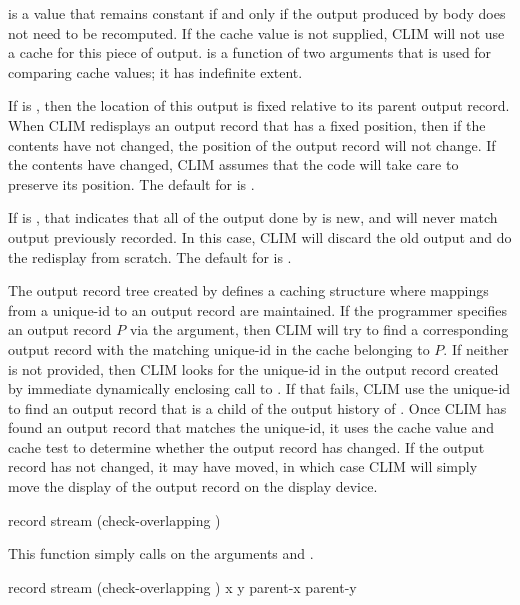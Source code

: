  is a value that remains constant if and only if the output
produced by body does not need to be recomputed.  If the cache value is not
supplied, CLIM will not use a cache for this piece of output.  
is a function of two arguments that is used for comparing cache values; it has
indefinite extent.

If  is , then the location of this output is
fixed relative to its parent output record.  When CLIM redisplays an output
record that has a fixed position, then if the contents have not changed, the
position of the output record will not change.  If the contents have changed,
CLIM assumes that the code will take care to preserve its position.  The default
for  is .

If  is , that indicates that all of the output done by
 is new, and will never match output previously recorded.  In this
case, CLIM will discard the old output and do the redisplay from scratch.  The
default for  is .

The output record tree created by  defines a caching
structure where mappings from a unique-id to an output record are maintained.
If the programmer specifies an output record $P$ via the
 argument, then CLIM will try to find a corresponding output
record with the matching unique-id in the cache belonging to $P$.  If neither
 is not provided, then CLIM looks for the unique-id in the
output record created by immediate dynamically enclosing call to
.  If that fails, CLIM use the unique-id to find an output
record that is a child of the output history of .  Once CLIM has
found an output record that matches the unique-id, it uses the cache value and
cache test to determine whether the output record has changed.  If the output
record has not changed, it may have moved, in which case CLIM will simply move
the display of the output record on the display device.


 {record stream \key (check-overlapping )}

This function simply calls  on the arguments
 and .

 {record stream
                                       \optional (check-overlapping ) 
                                                 x y parent-x parent-y}  

